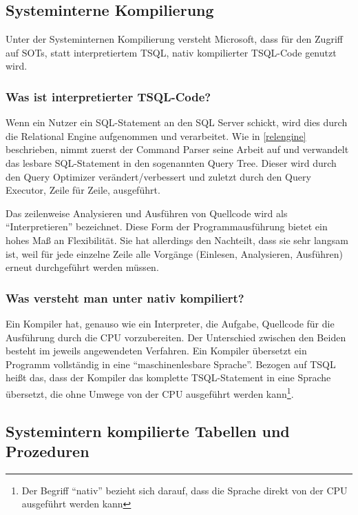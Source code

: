       \subsection{Systeminterne Kompilierung}
        Unter der Systeminternen Kompilierung versteht Microsoft, dass für den
        Zugriff auf SOTs, statt interpretiertem TSQL, nativ kompilierter
        TSQL-Code genutzt wird. 
        \subsubsection{Was ist interpretierter TSQL-Code?}
          Wenn ein Nutzer ein SQL-Statement an den SQL Server schickt, wird dies
          durch die Relational Engine aufgenommen und verarbeitet. Wie in
          \ref{relengine} beschrieben, nimmt zuerst der Command Parser seine
          Arbeit auf und verwandelt das lesbare SQL-Statement in den sogenannten
          Query Tree. Dieser wird durch den Query Optimizer verändert/verbessert
          und zuletzt durch den Query Executor, Zeile für Zeile, ausgeführt.
          
          Das zeilenweise Analysieren und Ausführen von Quellcode wird als
          \enquote{Interpretieren} bezeichnet. Diese Form der Programmausführung
          bietet ein hohes Maß an Flexibilität. Sie hat allerdings den
          Nachteilt, dass sie sehr langsam ist, weil für jede einzelne Zeile
          alle Vorgänge (Einlesen, Analysieren, Ausführen) erneut durchgeführt
          werden müssen.
        \subsubsection{Was versteht man unter nativ kompiliert?}
          Ein Kompiler hat, genauso wie ein Interpreter, die Aufgabe, Quellcode
          für die Ausführung durch die CPU vorzubereiten. Der Unterschied
          zwischen den Beiden besteht im jeweils angewendeten Verfahren. Ein
          Kompiler übersetzt ein Programm vollständig in eine
          \enquote{maschinenlesbare Sprache}. Bezogen auf TSQL heißt das, dass
          der Kompiler das komplette TSQL-Statement in eine Sprache übersetzt,
          die ohne Umwege von der CPU ausgeführt werden kann\footnote{Der
          Begriff \enquote{nativ} bezieht sich darauf, dass die Sprache direkt
          von der CPU ausgeführt werden kann}.
      \subsection{Systemintern kompilierte Tabellen und Prozeduren}
